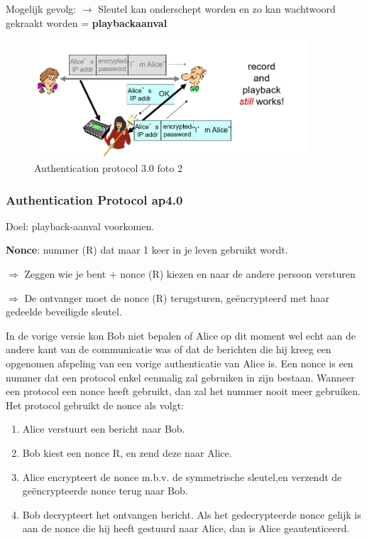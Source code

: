 \noindent Mogelijk gevolg: $\rightarrow$ Sleutel kan onderschept worden en zo kan wachtwoord gekraakt worden = \textbf{playbackaanval}

\begin{figure}[h]
    \centering
    \includegraphics[width=4in]{./img/imghfdst8/hfdst8puntje19.png}
    \caption{Authentication protocol 3.0 foto 2 }      
    \label{fig:Authentication protocol 3.0 foto 2}
\end{figure}

\newpage

\subsubsection{Authentication Protocol ap4.0}

\noindent Doel: playback-aanval voorkomen.

\noindent \textbf{Nonce}: nummer (R) dat maar 1 keer in je leven gebruikt wordt.

\noindent $\Rightarrow$ Zeggen wie je bent + nonce (R) kiezen en naar de andere persoon versturen

\noindent $\Rightarrow$ De ontvanger moet de nonce (R) terugsturen, geëncrypteerd met haar gedeelde beveiligde sleutel.

\noindent In de vorige versie kon Bob niet bepalen of Alice op dit moment wel echt aan de andere kant van de communicatie was of dat de berichten die hij kreeg een opgenomen afspeling van een vorige authenticatie van Alice is. Een nonce is een nummer dat een protocol enkel eenmalig zal gebruiken in zijn bestaan. Wanneer een protocol een nonce heeft gebruikt, dan zal het nummer nooit meer gebruiken. Het protocol gebruikt de nonce als volgt:
\begin{enumerate}
    \item Alice verstuurt een bericht naar Bob.
\item Bob kiest een nonce R, en zend deze naar Alice.
\item Alice encrypteert de nonce m.b.v. de symmetrische sleutel,en verzendt de geëncrypteerde nonce terug naar Bob.
\item Bob decrypteert het ontvangen bericht. Als het gedecrypteerde nonce gelijk is aan de nonce die hij heeft gestuurd naar Alice, dan is Alice geautenticeerd.

\end{enumerate}

